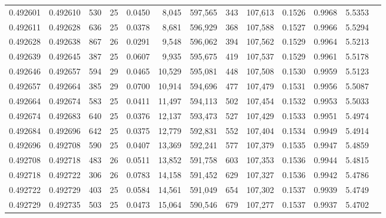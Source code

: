 \begin{tabular}{rrrrrrrrrrrrr}
0.492601 & 0.492610 & 530 &  25 &                                     0.0450 &   8,045 & 597,565 &     343 & 107,613 & 0.1526 & 0.9968 & 5.5353 \\
0.492611 & 0.492628 & 636 &  25 &                                     0.0378 &   8,681 & 596,929 &     368 & 107,588 & 0.1527 & 0.9966 & 5.5294 \\
0.492628 & 0.492638 & 867 &  26 &                                     0.0291 &   9,548 & 596,062 &     394 & 107,562 & 0.1529 & 0.9964 & 5.5213 \\
0.492639 & 0.492645 & 387 &  25 &                                     0.0607 &   9,935 & 595,675 &     419 & 107,537 & 0.1529 & 0.9961 & 5.5178 \\
0.492646 & 0.492657 & 594 &  29 &                                     0.0465 &  10,529 & 595,081 &     448 & 107,508 & 0.1530 & 0.9959 & 5.5123 \\
0.492657 & 0.492664 & 385 &  29 &                                     0.0700 &  10,914 & 594,696 &     477 & 107,479 & 0.1531 & 0.9956 & 5.5087 \\
0.492664 & 0.492674 & 583 &  25 &                                     0.0411 &  11,497 & 594,113 &     502 & 107,454 & 0.1532 & 0.9953 & 5.5033 \\
0.492674 & 0.492683 & 640 &  25 &                                     0.0376 &  12,137 & 593,473 &     527 & 107,429 & 0.1533 & 0.9951 & 5.4974 \\
0.492684 & 0.492696 & 642 &  25 &                                     0.0375 &  12,779 & 592,831 &     552 & 107,404 & 0.1534 & 0.9949 & 5.4914 \\
0.492696 & 0.492708 & 590 &  25 &                                     0.0407 &  13,369 & 592,241 &     577 & 107,379 & 0.1535 & 0.9947 & 5.4859 \\
0.492708 & 0.492718 & 483 &  26 &                                     0.0511 &  13,852 & 591,758 &     603 & 107,353 & 0.1536 & 0.9944 & 5.4815 \\
0.492718 & 0.492722 & 306 &  26 &                                     0.0783 &  14,158 & 591,452 &     629 & 107,327 & 0.1536 & 0.9942 & 5.4786 \\
0.492722 & 0.492729 & 403 &  25 &                                     0.0584 &  14,561 & 591,049 &     654 & 107,302 & 0.1537 & 0.9939 & 5.4749 \\
0.492729 & 0.492735 & 503 &  25 &                                     0.0473 &  15,064 & 590,546 &     679 & 107,277 & 0.1537 & 0.9937 & 5.4702 \\

\end{tabular}
